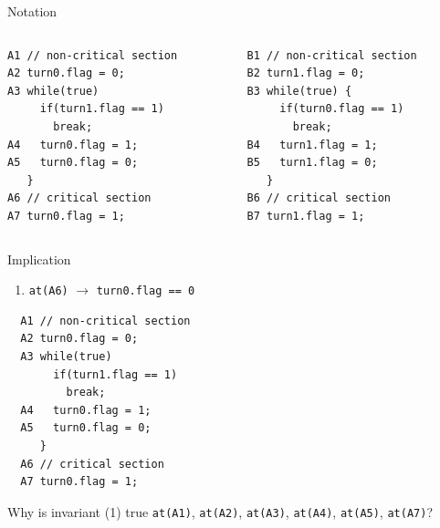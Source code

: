 \begin{frame}[fragile]{Notation}
  \begin{columns}[c]
    \begin{column}{0.50\textwidth}
\begin{lstlisting}[basicstyle=\fontsize{9}{11}\selectfont\ttfamily]
A1 // non-critical section
A2 turn0.flag = 0;
A3 while(true)
     if(turn1.flag == 1) 
       break;
A4   turn0.flag = 1;
A5   turn0.flag = 0;
   }
A6 // critical section
A7 turn0.flag = 1;
\end{lstlisting}
    \end{column}
    \begin{column}{0.50\textwidth}
\begin{lstlisting}[basicstyle=\fontsize{9}{11}\selectfont\ttfamily]
B1 // non-critical section
B2 turn1.flag = 0;
B3 while(true) {
     if(turn0.flag == 1) 
       break;
B4   turn1.flag = 1;
B5   turn1.flag = 0;
   }
B6 // critical section
B7 turn1.flag = 1;
\end{lstlisting}
    \end{column}
  \end{columns}
\end{frame}

\begin{frame}[fragile]{Implication}
  \begin{enumerate}
  \item \lstinline!at(A6)! $\rightarrow$ \lstinline!turn0.flag == 0!
  \end{enumerate}


\begin{lstlisting}
  A1 // non-critical section
  A2 turn0.flag = 0;
  A3 while(true)
       if(turn1.flag == 1) 
         break;
  A4   turn0.flag = 1;
  A5   turn0.flag = 0;
     }
  A6 // critical section
  A7 turn0.flag = 1;
\end{lstlisting}


  Why is invariant (1) true \lstinline!at(A1)!, \lstinline!at(A2)!,
  \lstinline!at(A3)!, \lstinline!at(A4)!, \lstinline!at(A5)!,
  \lstinline!at(A7)!?
\end{frame}

